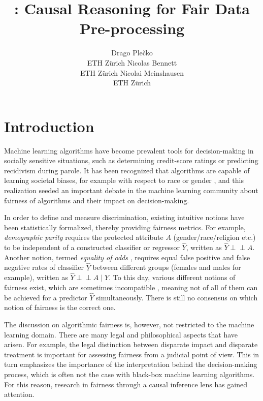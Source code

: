 \documentclass[
  nojss]{jss}
\author{
Drago Plečko\\ETH Zürich \And Nicolas Bennett\\ETH Zürich \And Nicolai Meinshausen\\ETH Zürich
}
\title{\pkg{fairadapt}: Causal Reasoning for Fair Data Pre-processing}
\begin{document}
\hypertarget{introduction}{%
\section{Introduction}\label{introduction}}

Machine learning algorithms have become prevalent tools for
decision-making in socially sensitive situations, such as determining
credit-score ratings or predicting recidivism during parole. It has been
recognized that algorithms are capable of learning societal biases, for
example with respect to race \citep{larson2016recidivism} or gender
\citep{lambrecht2019algorithmic, blau2003pay}, and this realization
seeded an important debate in the machine learning community about
fairness of algorithms and their impact on decision-making.

In order to define and measure discrimination, existing intuitive
notions have been statistically formalized, thereby providing fairness
metrics. For example, \emph{demographic parity}
\citep{darlington1971fairness} requires the protected attribute \(A\)
(gender/race/religion etc.) to be independent of a constructed
classifier or regressor \(\widehat{Y}\), written as
\(\widehat{Y} {\perp\!\!\!\perp}A\). Another notion, termed
\emph{equality of odds} \citep{hardt2016eosl}, requires equal false
positive and false negative rates of classifier \(\widehat{Y}\) between
different groups (females and males for example), written as
\(\widehat{Y} {\perp\!\!\!\perp}A \mid Y\). To this day, various
different notions of fairness exist, which are sometimes incompatible
\citep{corbett2018measure}, meaning not of all of them can be achieved
for a predictor \(\widehat{Y}\) simultaneously. There is still no
consensus on which notion of fairness is the correct one.

The discussion on algorithmic fairness is, however, not restricted to
the machine learning domain. There are many legal and philosophical
aspects that have arisen. For example, the legal distinction between
disparate impact and disparate treatment \citep{mcginley2011ricci} is
important for assessing fairness from a judicial point of view. This in
turn emphasizes the importance of the interpretation behind the
decision-making process, which is often not the case with black-box
machine learning algorithms. For this reason, research in fairness
through a causal inference lens has gained attention.
\end{document}
